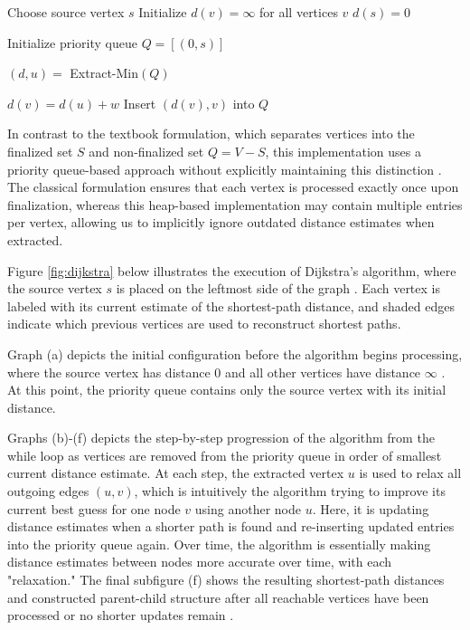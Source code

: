 \documentclass[12pt]{report}
\begin{document}
\begin{algorithm}[H]
\caption{Dijkstra's Algorithm}
\label{alg:dijkstra}
\begin{algorithmic}[1]

\State Choose source vertex $s$
\State Initialize $d(v)=\infty$ for all vertices $v$
\State $d(s)=0$

\State Initialize priority queue
\State $Q=[(0,s)]$


    \State $(d,u) =$ Extract-Min$(Q)$



            \State $d(v)=d(u)+w$
            \State Insert $(d(v),v)$ into $Q$

        \EndIf
    \EndFor
\EndWhile

\end{algorithmic}
\end{algorithm}

In contrast to the textbook formulation, which separates vertices into the finalized set $S$ and non-finalized set $Q = V - S$, this implementation uses a priority queue-based approach without explicitly maintaining this distinction \cite{CLRS}. The classical formulation ensures that each vertex is processed exactly once upon finalization, whereas this heap-based implementation may contain multiple entries per vertex, allowing us to implicitly ignore outdated distance estimates when extracted.

Figure \ref{fig:dijkstra} below illustrates the execution of Dijkstra's algorithm, where the source vertex $s$ is placed on the leftmost side of the graph \cite{CLRS}. Each vertex is labeled with its current estimate of the shortest-path distance, and shaded edges indicate which previous vertices are used to reconstruct shortest paths.

Graph (a) depicts the initial configuration before the algorithm begins processing, where the source vertex has distance 0 and all other vertices have distance $\infty$ \cite{CLRS}. At this point, the priority queue contains only the source vertex with its initial distance.

Graphs (b)-(f) depicts the step-by-step progression of the algorithm from the while loop as vertices are removed from the priority queue in order of smallest current distance estimate. At each step, the extracted vertex $u$ is used to relax all outgoing edges $(u,v)$, which is intuitively the algorithm trying to improve its current best guess for one node $v$ using another node $u$. Here, it is updating distance estimates when a shorter path is found and re-inserting updated entries into the priority queue again. Over time, the algorithm is essentially making distance estimates between nodes more accurate over time, with each "relaxation." The final subfigure (f) shows the resulting shortest-path distances and constructed parent-child structure after all reachable vertices have been processed or no shorter updates remain \cite{CLRS}.
\end{document}
